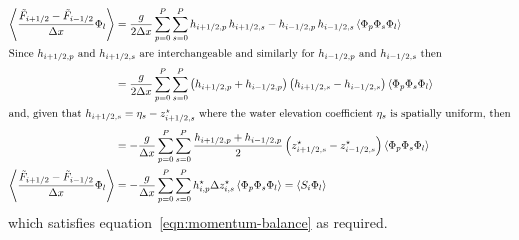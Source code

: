 \begin{align}
    \Ensemble{\frac{\riemannfluxcomponent_{i+1/2} -
    \riemannfluxcomponent_{i-1/2}}{\Delta x}
    \pcbasis_l}
    &=
    \frac{g}{2 \Delta x}
    \sum_{p=0}^P \sum_{\palt=0}^P
    h_{i+1/2,p} \, h_{i+1/2,\palt} - 
    h_{i-1/2,p} \, h_{i-1/2,\palt} 
    \Ensemble{\pcbasis_p \pcbasis_\palt \pcbasis_l} \nonumber \\
%
\intertext{Since $h_{i+1/2,p}$ and $h_{i+1/2,\palt}$ are interchangeable and similarly for $h_{i-1/2,p}$ and $h_{i-1/2,\palt}$ then}
%
    &= 
    \frac{g}{2 \Delta x}
    \sum_{p=0}^P \sum_{\palt=0}^P
    \left( h_{i+1/2,p} + h_{i-1/2,p} \right)
    \left( h_{i+1/2,\palt} - h_{i-1/2,\palt} \right)
    \Ensemble{\pcbasis_p \pcbasis_\palt \pcbasis_l} \nonumber \\
%
\intertext{and, given that $h_{i+1/2,\palt} = \eta_\palt - \zmodified_{i+1/2,\palt}$ where the water elevation coefficient $\eta_\palt$ is spatially uniform, then}
    &=
    -\frac{g}{\Delta x}
    \sum_{p=0}^P \sum_{\palt=0}^P
    \frac{h_{i+1/2,p} + h_{i-1/2,p}}{2}
    \left( \zmodified_{i+1/2,\palt} - \zmodified_{i-1/2,\palt} \right)
    \Ensemble{\pcbasis_p \pcbasis_\palt \pcbasis_l} \nonumber \\
%
    \Ensemble{\frac{\riemannfluxcomponent_{i+1/2} -
    \riemannfluxcomponent_{i-1/2}}{\Delta x}
    \pcbasis_l}
    &=
    - \frac{g}{\Delta x}
    \sum_{p=0}^P \sum_{\palt=0}^P
    \hmodified_{i,p} \Delta \zmodified_{i,\palt}
    \Ensemble{\pcbasis_p \pcbasis_\palt \pcbasis_l}
    = \Ensemble{S_i \pcbasis_l}
\end{align}
which satisfies equation~\eqref{eqn:momentum-balance} as required.